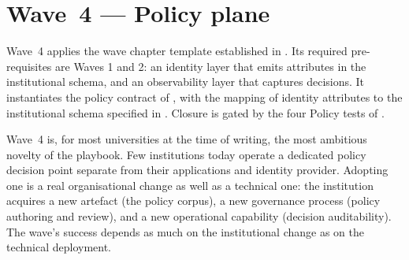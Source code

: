 
\chapter{Wave~4 --- Policy plane}
\label{ch:wave4-policy}

\begin{caveatbox}[Dependencies]
\noindent Wave~4 applies the wave chapter template established in
. Its required pre-requisites are
Waves 1 and 2: an identity layer that emits
attributes in the institutional schema, and an observability layer
that captures decisions. It instantiates the policy contract of
, with the mapping of identity attributes to
the institutional schema specified in . Closure is gated by
the four Policy tests of .
\end{caveatbox}

Wave~4 is, for most universities at the time of writing, the
most ambitious novelty of the playbook. Few institutions today
operate a dedicated policy decision point separate from their
applications and identity provider. Adopting one is a real
organisational change as well as a technical one: the institution
acquires a new artefact (the policy corpus), a new governance
process (policy authoring and review), and a new operational
capability (decision auditability). The wave's success depends as
much on the institutional change as on the technical deployment.

